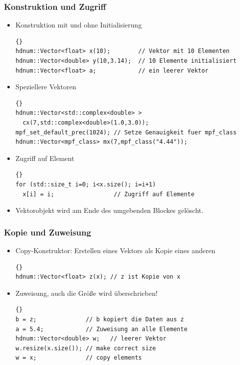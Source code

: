 \documentclass[a4paper,11pt]{article}
\theoremstyle{definition}
\begin{document}
\begin{frame}[fragile]
\frametitle{Konstruktion und Zugriff}
\begin{itemize}
\item Konstruktion mit und ohne Initialisierung\\
{\footnotesize{\begin{lstlisting}{}
hdnum::Vector<float> x(10);        // Vektor mit 10 Elementen
hdnum::Vector<double> y(10,3.14);  // 10 Elemente initialisiert
hdnum::Vector<float> a;            // ein leerer Vektor
\end{lstlisting}}}
\item Speziellere Vektoren\\
{\footnotesize{\begin{lstlisting}{}
hdnum::Vector<std::complex<double> >
  cx(7,std::complex<double>(1.0,3.0));
mpf_set_default_prec(1024); // Setze Genauigkeit fuer mpf_class
hdnum::Vector<mpf_class> mx(7,mpf_class("4.44"));
\end{lstlisting}}}
\item Zugriff auf Element\\
{\footnotesize{\begin{lstlisting}{}
for (std::size_t i=0; i<x.size(); i=i+1)
  x[i] = i;                 // Zugriff auf Elemente
\end{lstlisting}}}
\item Vektorobjekt wird am Ende des umgebenden Blockes gelöscht.
\end{itemize}
\end{frame}

\begin{frame}[fragile]
\frametitle{Kopie und Zuweisung}
\begin{itemize}
\item Copy-Konstruktor: Erstellen eines Vektors als Kopie eines anderen
{\footnotesize{\begin{lstlisting}{}
hdnum::Vector<float> z(x); // z ist Kopie von x
\end{lstlisting}}}
\item Zuweisung, auch die Größe wird überschrieben!
{\footnotesize{\begin{lstlisting}{}
b = z;              // b kopiert die Daten aus z
a = 5.4;            // Zuweisung an alle Elemente
hdnum::Vector<double> w;   // leerer Vektor
w.resize(x.size()); // make correct size
w = x;              // copy elements
\end{lstlisting}}}
\end{itemize}
\end{frame}
\end{document}
